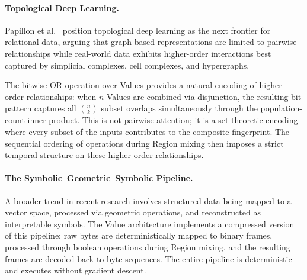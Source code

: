 \paragraph{Topological Deep Learning.}
Papillon et al.\ \citep{papillon2024tdl} position topological deep
learning as the next frontier for relational data, arguing that
graph-based representations are limited to pairwise relationships while
real-world data exhibits higher-order interactions best captured by
simplicial complexes, cell complexes, and hypergraphs.

The bitwise OR operation over Values provides a natural encoding of
higher-order relationships: when $n$ Values are combined via disjunction,
the resulting bit pattern captures all $\binom{n}{k}$ subset overlaps
simultaneously through the population-count inner product.  This is not
pairwise attention; it is a set-theoretic encoding where every subset of
the inputs contributes to the composite fingerprint.  The sequential
ordering of operations during Region mixing then imposes a strict
temporal structure on these higher-order relationships.

\paragraph{The Symbolic--Geometric--Symbolic Pipeline.}
A broader trend in recent research involves structured data being mapped
to a vector space, processed via geometric operations, and reconstructed
as interpretable symbols.  The Value architecture implements a
compressed version of this pipeline: raw bytes are deterministically
mapped to binary frames, processed through boolean operations during
Region mixing, and the resulting frames are decoded back to byte
sequences.  The entire pipeline is deterministic and executes without
gradient descent.
